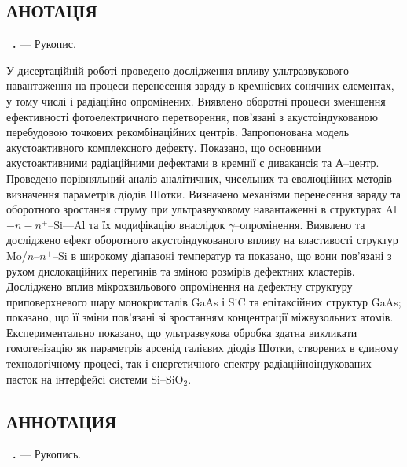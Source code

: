 
\begin{center}
\section*{\MakeUppercase{анотація}}
\end{center}

\textbf{\thesisAuthorFIO~\thesisTitle.} --- Рукопис.

\abstractBegin

У дисертаційній роботі проведено дослідження впливу ультразвукового навантаження на процеси перенесення заряду в кремнієвих сонячних елементах,
 у тому числі і радіаційно опромінених.
 Виявлено оборотні процеси зменшення ефективності фотоелектричного перетворення,
 пов'язані з акустоіндукованою перебудовою точкових рекомбінаційних центрів.
 Запропонована модель акустоактивного комплексного дефекту.
 Показано, що основними акустоактивними радіаційними дефектами в кремнії є дивакансія та А--центр.
 Проведено порівняльний аналіз аналітичних, чисельних та еволюційних методів визначення параметрів діодів Шотки.
 Визначено механізми перенесення заряду та оборотного зростання струму при ультразвуковому навантаженні
 в структурах Al$-n-n^+$--Si---Al та їх модифікацію внаслідок $\gamma$--опромінення.
 Виявлено та досліджено ефект оборотного акустоіндукованого  впливу на властивості структур Mo/$n$--$n^{+}$--Si в широкому діапазоні температур
 та показано, що вони пов'язані з рухом дислокаційних перегинів та зміною розмірів дефектних кластерів.
 Досліджено вплив мікрохвильового опромінення на дефектну структуру приповерхневого шару монокристалів GaAs і SiC та епітаксійних структур GaAs; 
 показано,  що її зміни пов'язані зі зростанням концентрації міжвузольних атомів.
 Експериментально показано, що ультразвукова обробка здатна викликати гомогенізацію як параметрів арсенід галієвих діодів Шотки, створених в єдиному технологічному процесі, так і енергетичного спектру радіаційноіндукованих пасток  на інтерфейсі системи  Si--SiO$_2$.

\keywords


\begin{center}
{\section*{\MakeUppercase{АННОТАЦИЯ}}}
\end{center}

\textbf{\thesisAuthorFIOru~\thesisTitleRu.} --- Рукопись.

\abstractBeginRu

